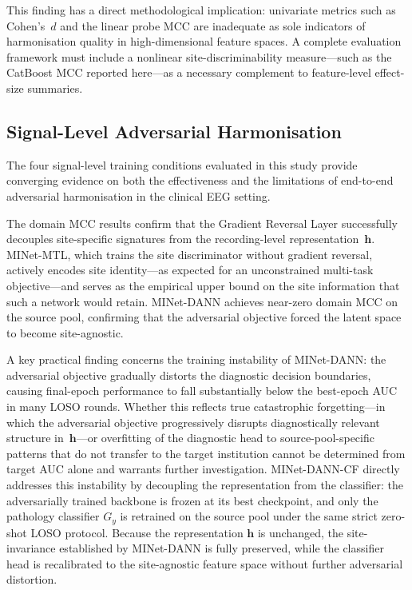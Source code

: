 \documentclass[preprint,12pt]{elsarticle}
\begin{document}
This finding has a direct methodological implication: univariate
metrics such as Cohen's~$d$ and the linear probe MCC are inadequate
as sole indicators of harmonisation quality in high-dimensional
feature spaces.
A complete evaluation framework must include a nonlinear
site-discriminability measure---such as the CatBoost MCC reported
here---as a necessary complement to feature-level effect-size
summaries.

\subsection{Signal-Level Adversarial Harmonisation}
\label{subsec:disc_dann}
The four signal-level training conditions evaluated in this study
provide converging evidence on both the effectiveness and the
limitations of end-to-end adversarial harmonisation in the clinical
EEG setting.

The domain MCC results confirm that the Gradient Reversal Layer
successfully decouples site-specific signatures from the
recording-level representation~$\mathbf{h}$.
MINet-MTL, which trains the site discriminator without gradient
reversal, actively encodes site identity---as expected for an
unconstrained multi-task objective---and serves as the empirical
upper bound on the site information that such a network would retain.
MINet-DANN achieves near-zero domain MCC on the source pool,
confirming that the adversarial objective forced the latent space to
become site-agnostic.

A key practical finding concerns the training instability of
MINet-DANN: the adversarial objective gradually distorts the
diagnostic decision boundaries, causing final-epoch performance to
fall substantially below the best-epoch AUC in many LOSO rounds.
Whether this reflects true catastrophic forgetting---in which the
adversarial objective progressively disrupts diagnostically relevant
structure in~$\mathbf{h}$---or overfitting of the diagnostic head
to source-pool-specific patterns that do not transfer to the target
institution cannot be determined from target AUC alone and warrants
further investigation.
MINet-DANN-CF directly addresses this instability by decoupling the
representation from the classifier: the adversarially trained backbone
is frozen at its best checkpoint, and only the pathology classifier
$G_y$ is retrained on the source pool under the same strict zero-shot
LOSO protocol.
Because the representation $\mathbf{h}$ is unchanged, the
site-invariance established by MINet-DANN is fully preserved, while
the classifier head is recalibrated to the site-agnostic feature
space without further adversarial distortion.
\end{document}

